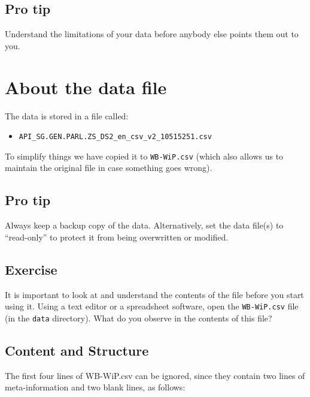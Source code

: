 \documentclass[a4paper,9pt,twocolumn,twoside,printwatermark=false]{pinp}
\providecommand{\tightlist}{%
  \setlength{\itemsep}{0pt}\setlength{\parskip}{0pt}}
\begin{document}
\hypertarget{pro-tip}{%
\subsection{Pro tip}\label{pro-tip}}

Understand the limitations of your data before anybody else points them
out to you.

\hypertarget{about-the-data-file}{%
\section{About the data file}\label{about-the-data-file}}

The data is stored in a file called:

\begin{itemize}
\tightlist
\item
  \texttt{API\_SG.GEN.PARL.ZS\_DS2\_en\_csv\_v2\_10515251.csv}
\end{itemize}

To simplify things we have copied it to \texttt{WB-WiP.csv} (which also
allows us to maintain the original file in case something goes wrong).

\hypertarget{pro-tip-1}{%
\subsection{Pro tip}\label{pro-tip-1}}

Always keep a backup copy of the data. Alternatively, set the data
file(s) to ``read-only'' to protect it from being overwritten or
modified.

\hypertarget{exercise}{%
\subsection{Exercise}\label{exercise}}

It is important to look at and understand the contents of the file
before you start using it. Using a text editor or a spreadsheet
software, open the \texttt{WB-WiP.csv} file (in the \texttt{data}
directory). What do you observe in the contents of this file?

\hypertarget{content-and-structure}{%
\subsection{Content and Structure}\label{content-and-structure}}

The first four lines of WB-WiP.csv can be ignored, since they contain
two lines of meta-information and two blank lines, as follows:
\end{document}

